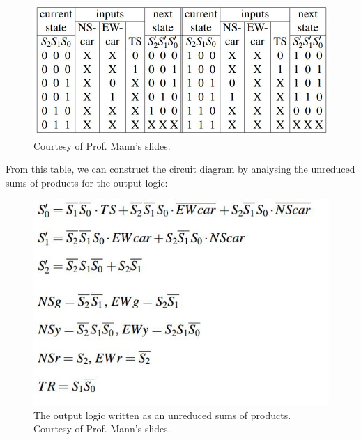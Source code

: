 \documentclass{report}
\begin{document}
\begin{figure}[ht]
\begin{center}
\includegraphics[scale=0.3]{next-state-table-extended.jpg}
\end{center}
\caption{Courtesy of Prof. Mann's slides.}
\end{figure}
\newpage\noindent From this table, we can construct the circuit diagram by analysing the unreduced sums of products for the output logic:
\begin{figure}[ht]
\begin{center}
\includegraphics[scale=0.5]{output-logic.jpg}
\end{center}
\caption{The output logic written as an unreduced sums of products. Courtesy of Prof. Mann's slides.}
\end{figure}
\end{document}
